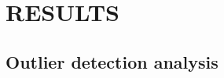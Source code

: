 \documentclass{article}
\begin{document}
%
% 
% 
%

\section*{RESULTS}

\subsection*{Outlier detection analysis}
\end{document}
